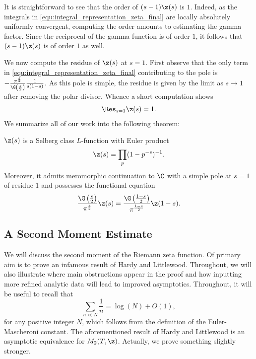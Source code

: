 \documentclass[12pt]{article}
\begin{document}
      It is straightforward to see that the order of \((s-1)\z(s)\) is \(1\). Indeed, as the integrals in \cref{equ:integral_representation_zeta_final} are locally absolutely uniformly convergent, computing the order amounts to estimating the gamma factor. Since the reciprocal of the gamma function is of order \(1\), it follows that \((s-1)\z(s)\) is of order \(1\) as well.

      We now compute the residue of \(\z(s)\) at \(s = 1\). First observe that the only term in \cref{equ:integral_representation_zeta_final} contributing to the pole is \(-\frac{\pi^{\frac{s}{2}}}{\G\left(\frac{s}{2}\right)}\frac{1}{s(1-s)}\). As this pole is simple, the residue is given by the limit as \(s \to 1\) after removing the polar divisor. Whence a short computation shows
      \[
        \Res_{s = 1}\z(s) = 1.
      \]
      We summarize all of our work into the following theorem:

      \begin{theorem}\label{thm:zeta_Selberg}
        \(\z(s)\) is a Selberg class \(L\)-function with Euler product
        \[
          \z(s) = \prod_{p}(1-p^{-s})^{-1}.
        \]
        Moreover, it admits meromorphic continuation to \(\C\) with a simple pole at \(s = 1\) of residue \(1\) and possesses the functional equation
        \[
          \frac{\G\left(\frac{s}{2}\right)}{\pi^{\frac{s}{2}}}\z(s) = \frac{\G\left(\frac{1-s}{2}\right)}{\pi^{\frac{1-s}{2}}}\z(1-s).
        \]
      \end{theorem}
    \subsection{A Second Moment Estimate}
      We will discuss the second moment of the Riemann zeta function. Of primary aim is to prove an infamous result of Hardy and Littlewood. Throughout, we will also illustrate where main obstructions appear in the proof and how inputting more refined analytic data will lead to improved asymptotics. Throughout, it will be useful to recall that
      \begin{equation}\label{equ:approximation_for_harmonic_sums}
        \sum_{n \ll N}\frac{1}{n} = \log(N)+O(1),
      \end{equation}
      for any positive integer \(N\), which follows from the definition of the Euler-Mascheroni constant. The aforementioned result of Hardy and Littlewood is an asymptotic equivalence for \(M_{2}(T,\z)\). Actually, we prove something slightly stronger.
\end{document}
